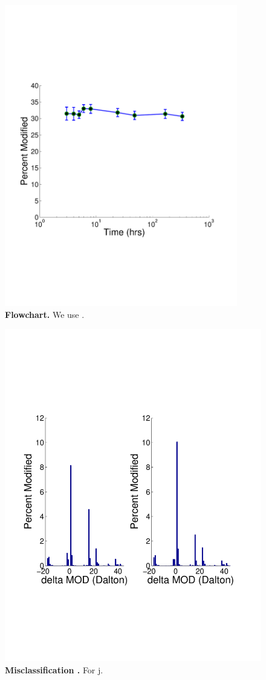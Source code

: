 \documentclass[12pt]{article}
\begin{document}
\begin{figure}[!ht]
\centerline{\includegraphics[width=4in]{Figures/Paper_Ecoli_PTM_Modified_Figure1.pdf}}
\caption{\label{fig:flowchart}\textbf{Flowchart.} We use .
}
\end{figure}

\clearpage
\begin{figure}[!ht]
\centerline{\includegraphics[width=5.5in]{Figures/Paper_Ecoli_PTMs.pdf}}
\caption{\label{fig:misclassification}\textbf{Misclassification .} For j.}
\end{figure}
\end{document}
